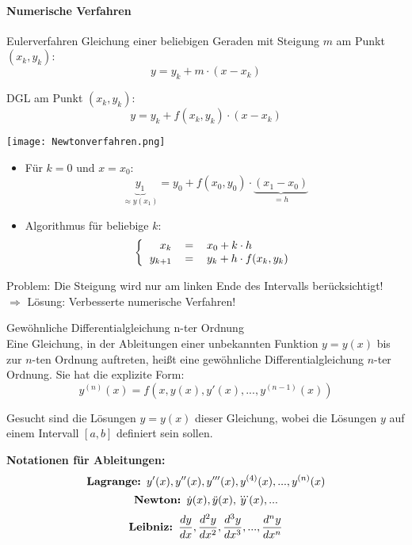 \paragraph{Numerische Verfahren}
\begin{definition}{Eulerverfahren}
  Gleichung einer beliebigen Geraden mit Steigung \(m\) am Punkt \((x_k,y_k)\):
      \[y=y_k+m\cdot(x-x_k)\]
    \begin{minipage}{0.5\linewidth}
      DGL am Punkt \((x_k,y_k)\):
      \[y=y_k+f(x_k,y_k)\cdot (x-x_k)\]
    \end{minipage}
    \begin{minipage}{0.45\linewidth}
      \begin{center}
        \texttt{[image: Newtonverfahren.png]}
        \end{center}
    \end{minipage}
  \begin{itemize}

    \item Für \(k=0 \text{ und } x=x_0\):
      \[\underbrace{y_1}_{\approx y(x_1)}=y_0+f(x_0,y_0)\cdot\underbrace{(x_1-x_0)}_{=h}\]
    \item Algorithmus für beliebige \(k\):
      \[\left\{\begin{tabular}{rcl}
	  \(x_k\)&\(=\)&\(x_0+k\cdot h\)\\
	  \(y_{k+1}\)&\(=\)&\(y_k+h\cdot f(x_k,y_k)\)
	\end{tabular}
      \right.\]
  \end{itemize}
  Problem: Die Steigung wird nur am linken Ende des Intervalls berücksichtigt!
    \\ $\Rightarrow$ Lösung: Verbesserte numerische Verfahren!
\end{definition}


\begin{definition}{Gewöhnliche Differentialgleichung n-ter Ordnung}\\
Eine Gleichung, in der Ableitungen einer unbekannten Funktion $y = y(x)$ bis zur $n$-ten Ordnung auftreten, heißt eine gewöhnliche Differentialgleichung $n$-ter Ordnung. Sie hat die explizite Form:
$$y^{(n)}(x) = f(x, y(x), y'(x), ..., y^{(n-1)}(x))$$

Gesucht sind die Lösungen $y = y(x)$ dieser Gleichung, wobei die Lösungen $y$ auf einem Intervall $[a,b]$ definiert sein sollen.

\textbf{Notationen für Ableitungen:}
$$\text{\textbf{Lagrange: }} y'(x), y''(x), y'''(x), y^{(4)}(x), ..., y^{(n)}(x)$$
$$\text{\textbf{Newton: }} \dot{y}(x), \ddot{y}(x), \dddot{y}(x), ...$$
$$\text{\textbf{Leibniz: }} \frac{dy}{dx}, \frac{d^2y}{dx^2}, \frac{d^3y}{dx^3}, ..., \frac{d^ny}{dx^n}$$
\end{definition}

